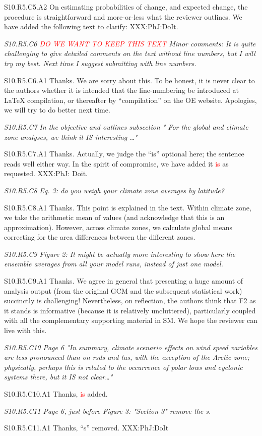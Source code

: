 \documentclass[a4paper,10pt]{article}
\newcommand{\ed}[1]{\textcolor{red}{#1}}
\begin{document}
	S10.R5.C5.A2 On estimating probabilities of change, and expected change, the procedure is straightforward and more-or-less what the reviewer outlines. We have added the following text to clarify: XXX:PhJ:DoIt.

	
	\emph{S10.R5.C6 \ed{DO WE WANT TO KEEP THIS TEXT} Minor comments: It is quite challenging to give detailed comments on the text without line numbers, but I will try my best. Next time I suggest submitting with line numbers.}
	
	S10.R5.C6.A1 Thanks. We are sorry about this. To be honest, it is never clear to the authors whether it is intended that the line-numbering be introduced at LaTeX compilation, or thereafter by ``compilation'' on the OE website. Apologies, we will try to do better next time.


	\emph{S10.R5.C7 In the objective and outlines subsection " For the global and climate zone analyses, we think it IS interesting …"}
		
	S10.R5.C7.A1 Thanks. Actually, we judge the ``is'' optional here; the sentence reads well either way. In the spirit of compromise, we have added it \ed{is} as requested. XXX:PhJ: Doit.
	
	\emph{S10.R5.C8 Eq. 3: do you weigh your climate zone averages by latitude?}

	S10.R5.C8.A1 Thanks. This point is explained in the text. Within climate zone, we take the arithmetic mean of values (and acknowledge that this is an approximation). However, across climate zones, we calculate global means correcting for the area differences between the different zones.

	\emph{S10.R5.C9 Figure 2: It might be actually more interesting to show here the ensemble averages from all your model runs, instead of just one model.}

	S10.R5.C9.A1 Thanks. We agree in general that presenting a huge amount of analysis output (from the original GCM and the subsequent statistical work) succinctly is challenging! Nevertheless, on reflection, the authors think that F2 as it stands is informative (because it is relatively uncluttered), particularly coupled with all the complementary supporting material in SM. We hope the reviewer can live with this. 

	\emph{S10.R5.C10 Page 6 "In summary, climate scenario effects on wind speed variables are less pronounced than on rsds and tas, with the exception of the Arctic zone; physically, perhaps this is related to the occurrence of polar lows and cyclonic systems there, but it IS not clear…"}

	S10.R5.C10.A1 Thanks, \ed{is} added.

	\emph{S10.R5.C11 Page 6, just before Figure 3: "Section 3" remove the s.}

	S10.R5.C11.A1 Thanks, ``s'' removed. XXX:PhJ:DoIt

	
	
	
\end{document}
